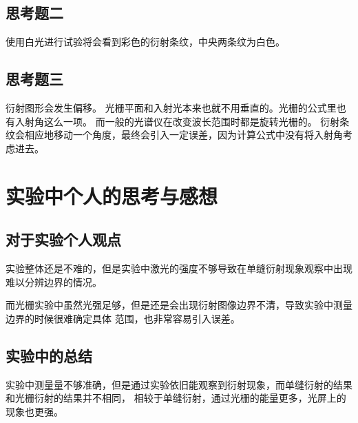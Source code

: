 \documentclass{ctexart}
\begin{document}
  \subsection{思考题二}
  使用白光进行试验将会看到彩色的衍射条纹，中央两条纹为白色。

  \subsection{思考题三}
  衍射图形会发生偏移。
  光栅平面和入射光本来也就不用垂直的。光栅的公式里也有入射角这么一项。
  而一般的光谱仪在改变波长范围时都是旋转光栅的。
  衍射条纹会相应地移动一个角度，最终会引入一定误差，因为计算公式中没有将入射角考虑进去。

\section{实验中个人的思考与感想}
  \subsection{对于实验个人观点}
  实验整体还是不难的，但是实验中激光的强度不够导致在单缝衍射现象观察中出现难以分辨边界的情况。
  
  而光栅实验中虽然光强足够，但是还是会出现衍射图像边界不清，导致实验中测量边界的时候很难确定具体
  范围，也非常容易引入误差。

  \subsection{实验中的总结}
  实验中测量量不够准确，但是通过实验依旧能观察到衍射现象，而单缝衍射的结果和光栅衍射的结果并不相同，
  相较于单缝衍射，通过光栅的能量更多，光屏上的现象也更强。
\end{document}
